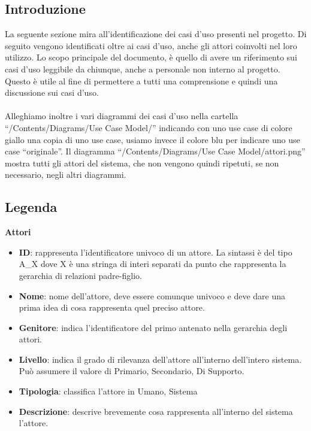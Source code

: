 \setlength{\arrayrulewidth}{.5mm}
\setlength{\tabcolsep}{5pt}
\renewcommand{\arraystretch}{2}
\renewcommand{\labelenumii}{\theenumii}
\renewcommand{\theenumii}{\theenumi.\arabic{enumii}.}

\newcommand{\lastUC}{\theucCounter}
\newcommand{\nextUC}{\stepcounter{ucCounter}{\theucCounter}}


\subsection{Introduzione}
La seguente sezione mira all'identificazione dei casi d'uso presenti nel progetto. Di seguito vengono identificati oltre ai casi d'uso, anche gli attori coinvolti nel loro utilizzo.
Lo scopo principale del documento, è quello di avere un riferimento sui casi d'uso leggibile da chiunque, anche a personale non interno al progetto. Questo è utile al fine di permettere a tutti una comprensione e quindi una discussione sui casi d'uso.\\\\
Alleghiamo inoltre i vari diagrammi dei casi d'uso nella cartella ``/Contents/Diagrams/Use Case Model/'' indicando con uno use case di colore giallo una copia di uno use case, usiamo invece il colore blu per indicare uno use case ``originale''. Il diagramma ``/Contents/Diagrams/Use Case Model/attori.png'' mostra tutti gli attori del sistema, che non vengono quindi ripetuti, se non necessario, negli altri diagrammi.

\subsection{Legenda}
\large{\textbf{Attori}} \\
\begin{itemize}[]
	\item \textbf{ID}: rappresenta l'identificatore univoco di un attore. La sintassi è del tipo A\_X dove X è una stringa di interi separati da punto che rappresenta la gerarchia di relazioni padre-figlio.
	\item \textbf{Nome}: nome dell'attore, deve essere comunque univoco e deve dare una prima idea di cosa rappresenta quel preciso attore.
	\item \textbf{Genitore}: indica l'identificatore del primo antenato nella gerarchia degli attori.
	\item \textbf{Livello}: indica il grado di rilevanza dell'attore all'interno dell'intero sistema. Può assumere il valore di {Primario, Secondario, Di Supporto}.
	\item \textbf{Tipologia}: classifica l'attore in {Umano, Sistema}
	\item \textbf{Descrizione}: descrive brevemente cosa rappresenta all'interno del sistema l'attore.
\end{itemize}


